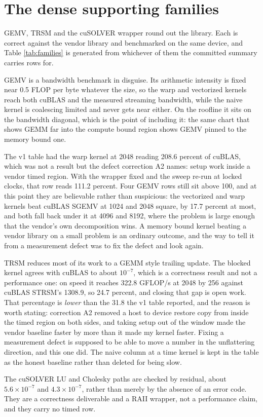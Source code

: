 \section{The dense supporting families}
\label{sec:families}

GEMV, TRSM and the cuSOLVER wrapper round out the library. Each is correct against
the vendor library and benchmarked on the same device, and Table \ref{tab:families}
is generated from whichever of them the committed summary carries rows for.

GEMV is a bandwidth benchmark in disguise. Its arithmetic intensity is fixed near
0.5 FLOP per byte whatever the size, so the warp and vectorized kernels reach both
cuBLAS and the measured streaming bandwidth, while the naive kernel is coalescing
limited and never gets near either. On the roofline it sits on the bandwidth
diagonal, which is the point of including it: the same chart that shows GEMM far
into the compute bound region shows GEMV pinned to the memory bound one.

The v1 table had the warp kernel at 2048 reading 208.6 percent of cuBLAS, which was
not a result but the defect correction A2 names: setup work inside a vendor timed
region. With the wrapper fixed and the sweep re-run at locked clocks, that row
reads 111.2 percent. Four GEMV rows still sit above 100, and at this point they
are believable rather than suspicious: the vectorized and warp kernels beat cuBLAS
SGEMV at 1024 and 2048 square, by 17.7 percent at most, and both fall back under it
at 4096 and 8192, where the problem is large enough that the vendor's own
decomposition wins. A memory bound kernel beating a vendor library on a small
problem is an ordinary outcome, and the way to tell it from a measurement defect
was to fix the defect and look again.

TRSM reduces most of its work to a GEMM style trailing update. The blocked kernel
agrees with cuBLAS to about $10^{-7}$, which is a correctness result and not a
performance one: on speed it reaches 322.8 GFLOP/s at 2048 by 256 against cuBLAS
STRSM's 1308.9, so 24.7 percent, and closing that gap is open work. That percentage
is \emph{lower} than the 31.8 the v1 table reported, and the reason is worth
stating: correction A2 removed a host to device restore copy from inside the timed
region on both sides, and taking setup out of the window made the vendor baseline
faster by more than it made my kernel faster. Fixing a measurement defect is
supposed to be able to move a number in the unflattering direction, and this one
did. The naive column at a time kernel is kept in the table as the honest baseline
rather than deleted for being slow.

The cuSOLVER LU and Cholesky paths are checked by residual, about $5.6 \times
10^{-7}$ and $4.3 \times 10^{-7}$, rather than merely by the absence of an error
code. They are a correctness deliverable and a RAII wrapper, not a performance
claim, and they carry no timed row.

\begin{table}[htbp]
\centering

\caption{The supporting families on the RTX 5070, each versus its vendor baseline,
generated from the families the committed summary actually carries.}
\label{tab:families}
\end{table}
